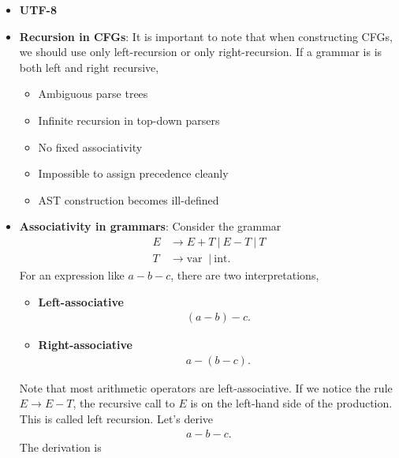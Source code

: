 \documentclass{report}
\begin{document}
\begin{itemize}
\begin{cppcode}
{                return i;
            }
            \end{cppcode}
        \item \textbf{UTF-8}
        \item \textbf{Recursion in CFGs}: It is important to note that when constructing CFGs, we should use only left-recursion or only right-recursion. If a grammar is is both left and right recursive, 
            \begin{itemize}
                \item Ambiguous parse trees
                \item Infinite recursion in top-down parsers
                \item No fixed associativity
                \item Impossible to assign precedence cleanly
                \item AST construction becomes ill-defined
            \end{itemize}
        \item \textbf{Associativity in grammars}: Consider the grammar
            \begin{align*}
                E &\to E + T\ |\ E - T \ |\ T \\
                T &\to \text{var }\ | \ \text{int}
            .\end{align*}
            For an expression like $a-b-c$, there are two interpretations,
            \begin{itemize}
                \item \textbf{Left-associative}
                    \begin{align*}
                        (a-b)-c
                    .\end{align*}
                \item \textbf{Right-associative}
                    \begin{align*}
                        a-(b-c)
                    .\end{align*}
            \end{itemize}
            Note that most arithmetic operators are left-associative. If we notice the rule $E \to E - T$, the recursive call to $E$ is on the left-hand side of the production. This is called left recursion. Let's derive 
            \begin{align*}
                a-b-c
            .\end{align*}
            The derivation is 
            \begin{align*}

\end{align*}
\end{itemize}
\end{document}
